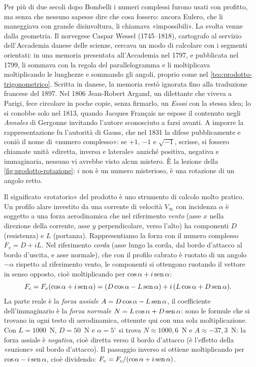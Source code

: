 \begin{notastorica}
Per più di due secoli dopo Bombelli i numeri complessi furono usati con profitto, ma senza
che nessuno sapesse dire che cosa fossero: ancora Eulero, che li maneggiava con grande
disinvoltura, li chiamava «impossibili». La svolta venne dalla geometria. Il norvegese
Caspar Wessel (1745--1818), cartografo al servizio dell'Accademia danese delle scienze,
cercava un modo di calcolare con i segmenti orientati: in una memoria presentata
all'Accademia nel 1797, e pubblicata nel 1799, li sommava con la regola del
parallelogramma e li moltiplicava moltiplicando le lunghezze e sommando gli angoli,
proprio come nel \cref{teo:prodotto-trigonometrico}. Scritta in danese, la memoria restò
ignorata fino alla traduzione francese del 1897. Nel 1806 Jean-Robert Argand, un
dilettante che viveva a Parigi, fece circolare in poche copie, senza firmarlo, un
\emph{Essai} con la stessa idea; lo si conobbe solo nel 1813, quando Jacques Français ne
espose il contenuto negli \emph{Annales} di Gergonne invitando l'autore sconosciuto a
farsi avanti. A imporre la rappresentazione fu l'autorità di Gauss, che nel 1831 la difese
pubblicamente e coniò il nome di «numero complesso»: se $+1$, $-1$ e $\sqrt{-1}$, scrisse,
si fossero chiamate unità «diretta, inversa e laterale» anziché positiva, negativa e
immaginaria, nessuno vi avrebbe visto alcun mistero. È la lezione della
\cref{fig:prodotto-rotazione}: $i$ non è un numero misterioso, è una rotazione di un
angolo retto.
\end{notastorica}

\begin{esempio}\label{es:assi-profilo}
Il significato «rotatorio» del prodotto è uno strumento di calcolo molto pratico. Un
profilo alare investito da una corrente di velocità $V_{\infty}$ con incidenza $\alpha$
è soggetto a una forza aerodinamica che nel riferimento \emph{vento} (asse $x$ nella
direzione della corrente, asse $y$ perpendicolare, verso l'alto) ha componenti $D$
(resistenza) e $L$ (portanza). Rappresentiamo la forza con il numero complesso
$F_{v}=D+iL$. Nel riferimento \emph{corda} (asse lungo la corda, dal bordo d'attacco al
bordo d'uscita, e asse normale), che con il profilo cabrato è ruotato di un angolo
$-\alpha$ rispetto al riferimento vento, le componenti si ottengono ruotando il vettore
in senso opposto, cioè moltiplicando per $\cos\alpha+i\operatorname{sen}\alpha$:
\[
  F_{c}=F_{v}(\cos\alpha+i\operatorname{sen}\alpha)=(D\cos\alpha-L\operatorname{sen}\alpha)+i\,(L\cos\alpha+D\operatorname{sen}\alpha).
\]
La parte reale è la \emph{forza assiale} $A=D\cos\alpha-L\operatorname{sen}\alpha$, il coefficiente
dell'immaginario è la \emph{forza normale} $N=L\cos\alpha+D\operatorname{sen}\alpha$: sono le formule
che si trovano in ogni testo di aerodinamica, ottenute qui con una sola moltiplicazione.
Con $L=1000$~N, $D=50$~N e $\alpha=5^{\circ}$ si trova $N\approx1000{,}6$~N e
$A\approx-37{,}3$~N: la forza assiale è
\emph{negativa}, cioè diretta verso il bordo d'attacco (è l'effetto della
«suzione» sul bordo d'attacco). Il passaggio inverso si ottiene moltiplicando per
$\cos\alpha-i\operatorname{sen}\alpha$, cioè dividendo: $F_{v}=F_{c}/(\cos\alpha+i\operatorname{sen}\alpha)$.
\end{esempio}

